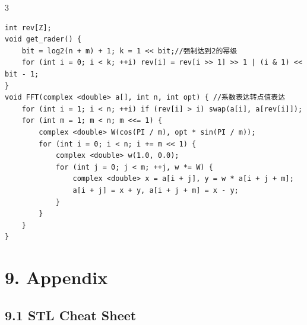 \documentclass[8pt]{extarticle}
\begin{document}
\begin{multicols*}{3}
\begin{lstlisting}
int rev[Z];
void get_rader() {
    bit = log2(n + m) + 1; k = 1 << bit;//强制达到2的幂级
    for (int i = 0; i < k; ++i) rev[i] = rev[i >> 1] >> 1 | (i & 1) << bit - 1;
}
void FFT(complex <double> a[], int n, int opt) { //系数表达转点值表达
    for (int i = 1; i < n; ++i) if (rev[i] > i) swap(a[i], a[rev[i]]);
    for (int m = 1; m < n; m <<= 1) {
        complex <double> W(cos(PI / m), opt * sin(PI / m));
        for (int i = 0; i < n; i += m << 1) {
            complex <double> w(1.0, 0.0);
            for (int j = 0; j < m; ++j, w *= W) {
                complex <double> x = a[i + j], y = w * a[i + j + m];
                a[i + j] = x + y, a[i + j + m] = x - y;
            }
        }
    }
}
\end{lstlisting}

\section*{9. Appendix}

\subsection*{9.1 STL Cheat Sheet}


\end{multicols*}
\end{document}
